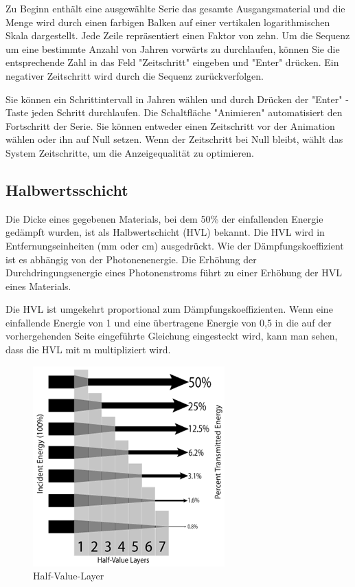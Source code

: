 Zu Beginn enthält eine ausgewählte Serie das gesamte Ausgangsmaterial und die Menge wird durch einen farbigen Balken auf einer vertikalen logarithmischen Skala dargestellt. Jede Zeile repräsentiert einen Faktor von zehn. Um die Sequenz um eine bestimmte Anzahl von Jahren vorwärts zu durchlaufen, können Sie die entsprechende Zahl in das Feld "Zeitschritt" eingeben und "Enter" drücken. Ein negativer Zeitschritt wird durch die Sequenz zurückverfolgen.

Sie können ein Schrittintervall in Jahren wählen und durch Drücken der "Enter" -Taste jeden Schritt durchlaufen. Die Schaltfläche "Animieren" automatisiert den Fortschritt der Serie. Sie können entweder einen Zeitschritt vor der Animation wählen oder ihn auf Null setzen. Wenn der Zeitschritt bei Null bleibt, wählt das System Zeitschritte, um die Anzeigequalität zu optimieren.
\subsection{Halbwertsschicht}
Die Dicke eines gegebenen Materials, bei dem 50\% der einfallenden Energie gedämpft wurden, ist als Halbwertschicht (HVL) bekannt. Die HVL wird in Entfernungseinheiten (mm oder cm) ausgedrückt. Wie der Dämpfungskoeffizient ist es abhängig von der Photonenenergie. Die Erhöhung der Durchdringungsenergie eines Photonenstroms führt zu einer Erhöhung der HVL eines Materials.

Die HVL ist umgekehrt proportional zum Dämpfungskoeffizienten. Wenn eine einfallende Energie von 1 und eine übertragene Energie von 0,5 in die auf der vorhergehenden Seite eingeführte Gleichung eingesteckt wird, kann man sehen, dass die HVL mit m multipliziert wird.
 \begin{figure}[htb]
 \centering 
  \includegraphics[scale=0.5]{img/Half-Value-Layer.png}
  \caption{Half-Value-Layer}
  \label{fig:Half-Value-Layer}
  \end{figure}


